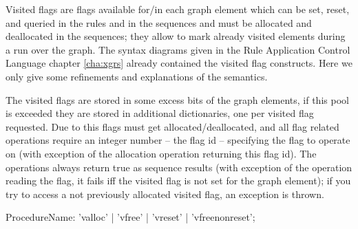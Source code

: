 Visited flags are flags available for/in each graph element which can be set, reset, and queried in the rules and in the sequences and must be allocated and deallocated in the sequences;
they allow to mark already visited elements during a run over the graph.
The syntax diagrams given in the Rule Application Control Language chapter \ref{cha:xgrs} already contained the visited flag constructs.
Here we only give some refinements and explanations of the semantics.

The visited flags are stored in some excess bits of the graph elements, if this pool is exceeded they are stored in additional dictionaries, one per visited flag requested.
Due to this flags must get allocated/deallocated, and all flag related operations require an integer number -- the flag id -- specifying the flag to operate on (with exception of the allocation operation returning this flag id).
The operations always return true as sequence results (with exception of the operation reading the flag, it fails iff the visited flag is not set for the graph element);
if you try to access a not previously allocated visited flag, an exception is thrown.

\begin{rail}
  ProcedureName: 'valloc' | 'vfree' | 'vreset' | 'vfreenonreset';
\end{rail}

